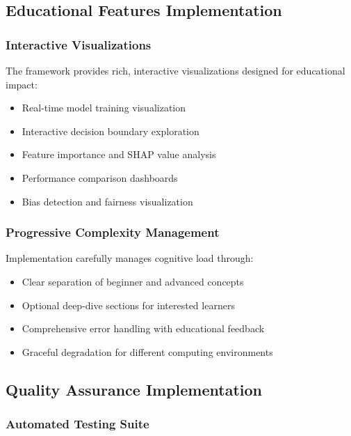 \subsection{Educational Features Implementation}

\subsubsection{Interactive Visualizations}

The framework provides rich, interactive visualizations designed for educational impact:

\begin{itemize}
    \item Real-time model training visualization
    \item Interactive decision boundary exploration
    \item Feature importance and SHAP value analysis
    \item Performance comparison dashboards
    \item Bias detection and fairness visualization
\end{itemize}

\subsubsection{Progressive Complexity Management}

Implementation carefully manages cognitive load through:

\begin{itemize}
    \item Clear separation of beginner and advanced concepts
    \item Optional deep-dive sections for interested learners
    \item Comprehensive error handling with educational feedback
    \item Graceful degradation for different computing environments
\end{itemize}

\subsection{Quality Assurance Implementation}

\subsubsection{Automated Testing Suite}

